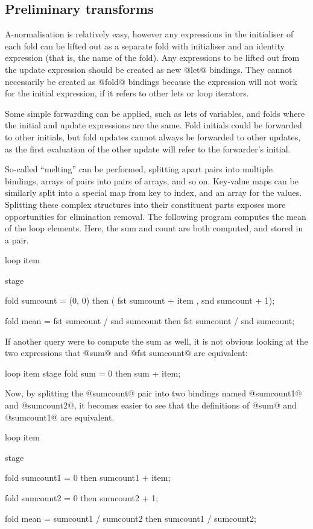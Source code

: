 \subsection{Preliminary transforms}

A-normalisation is relatively easy, however any expressions in the initialiser of each fold can be lifted out as a separate fold with initialiser and an identity expression (that is, the name of the fold).
Any expressions to be lifted out from the update expression should be created as new @let@ bindings.
They cannot necessarily be created as @fold@ bindings because the expression will not work for the initial expression, if it refers to other lets or loop iterators.

Some simple forwarding can be applied, such as lets of variables, and folds where the initial and update expressions are the same.
Fold initials could be forwarded to other initials, but fold updates cannot always be forwarded to other updates, as the first evaluation of the other update will refer to the forwarder's initial.

So-called ``melting'' can be performed, splitting apart pairs into multiple bindings, arrays of pairs into pairs of arrays, and so on.
Key-value maps can be similarly split into a special map from key to index, and an array for the values.
Splitting these complex structures into their constituent parts exposes more opportunities for elimination removal.
The following program computes the mean of the loop elements. Here, the sum and count are both computed, and stored in a pair.

\begin{code}
loop item {
  stage {
    fold sumcount
     = (0, 0)
     then
       ( fst sumcount + item
       , snd sumcount + 1);

    fold mean
     = fst sumcount / snd sumcount
     then
       fst sumcount / snd sumcount;
  }
}
\end{code}

If another query were to compute the sum as well, it is not obvious looking at the two expressions that @sum@ and @fst sumcount@ are equivalent:
\begin{code}
loop item {
  stage {
    fold sum
     = 0
     then
       sum + item;
  }
}
\end{code}

Now, by splitting the @sumcount@ pair into two bindings named @sumcount1@ and @sumcount2@, it becomes easier to see that the definitions of @sum@ and @sumcount1@ are equivalent.
\begin{code}
loop item {
  stage {
    fold sumcount1
     = 0
     then
       sumcount1 + item;

    fold sumcount2
     = 0
     then
       sumcount2 + 1;

    fold mean
     = sumcount1 / sumcount2
     then
       sumcount1 / sumcount2;
  }
}
\end{code}


